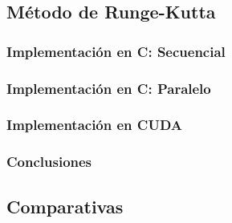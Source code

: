 \subsection{Método de Runge-Kutta}
\subsubsection{Implementación en C: Secuencial}
\subsubsection{Implementación en C: Paralelo}
\subsubsection{Implementación en CUDA}
\subsubsection{Conclusiones}

\subsection{Comparativas}